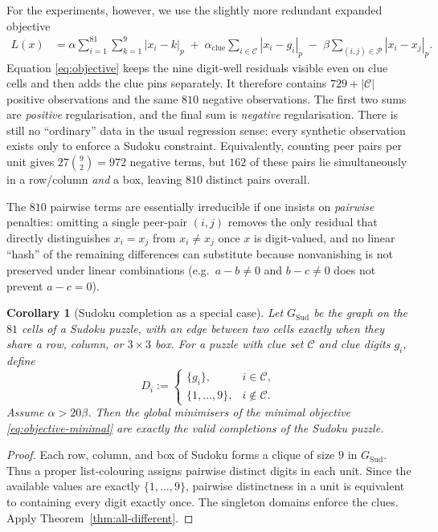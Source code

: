 \documentclass[11pt]{article}
\newtheorem{corollary}[theorem]{Corollary}
\begin{document}
For the experiments, however, we use the slightly more redundant expanded objective
\begin{align}
L(x) &=
\alpha\sum_{i=1}^{81}\sum_{k=1}^9 |x_i - k|_p
\;+\;
\alpha_{\mathrm{clue}}\sum_{i\in\mathcal{C}} |x_i - g_i|_p
\;-\;
\beta\sum_{(i,j)\in\mathcal{P}} |x_i-x_j|_p.
\label{eq:objective}
\end{align}
Equation \eqref{eq:objective} keeps the nine digit-well residuals visible even on clue cells and then adds the clue pins separately. It therefore contains \(729+|\mathcal C|\) positive observations and the same \(810\) negative observations. The first two sums are \emph{positive} regularisation, and the final sum is \emph{negative} regularisation. There is still no ``ordinary'' data in the usual regression sense: every synthetic observation exists only to enforce a Sudoku constraint. Equivalently, counting peer pairs per unit gives $27\binom{9}{2}=972$ negative terms, but $162$ of these pairs lie simultaneously in a row/column \emph{and} a box, leaving $810$ distinct pairs overall.

The $810$ pairwise terms are essentially irreducible if one insists on \emph{pairwise} penalties: omitting a single peer-pair $(i,j)$ removes the only residual that directly distinguishes $x_i=x_j$ from $x_i\neq x_j$ once $x$ is digit-valued, and no linear ``hash'' of the remaining differences can substitute because nonvanishing is not preserved under linear combinations (e.g.\ $a-b\neq 0$ and $b-c\neq 0$ does not prevent $a-c=0$).

\begin{corollary}[Sudoku completion as a special case]
\label{cor:sudoku-special-case}
Let \(G_{\mathrm{Sud}}\) be the graph on the \(81\) cells of a Sudoku puzzle, with an edge between two cells exactly when they share a row, column, or \(3\times 3\) box. For a puzzle with clue set \(\mathcal{C}\) and clue digits \(g_i\), define
\[
D_i :=
\begin{cases}
\{g_i\}, & i\in \mathcal{C},\\
\{1,\dots,9\}, & i\notin \mathcal{C}.
\end{cases}
\]
Assume \(\alpha>20\beta\). Then the global minimisers of the minimal objective \eqref{eq:objective-minimal} are exactly the valid completions of the Sudoku puzzle.
\end{corollary}

\begin{proof}
Each row, column, and box of Sudoku forms a clique of size \(9\) in \(G_{\mathrm{Sud}}\). Thus a proper list-colouring assigns pairwise distinct digits in each unit. Since the available values are exactly \(\{1,\dots,9\}\), pairwise distinctness in a unit is equivalent to containing every digit exactly once. The singleton domains enforce the clues. Apply Theorem~\ref{thm:all-different}.
\end{proof}
\end{document}
